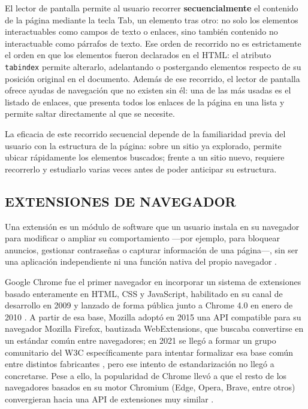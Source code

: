 El lector de pantalla permite al usuario recorrer \textbf{secuencialmente} el contenido de la página mediante la tecla Tab, un elemento tras otro: no solo los elementos interactuables como campos de texto o enlaces, sino también contenido no interactuable como párrafos de texto. Ese orden de recorrido no es estrictamente el orden en que los elementos fueron declarados en el HTML: el atributo \texttt{tabindex} permite alterarlo, adelantando o postergando elementos respecto de su posición original en el documento. Además de ese recorrido, el lector de pantalla ofrece ayudas de navegación que no existen sin él: una de las más usadas es el listado de enlaces, que presenta todos los enlaces de la página en una lista y permite saltar directamente al que se necesite.

La eficacia de este recorrido secuencial depende de la familiaridad previa del usuario con la estructura de la página: sobre un sitio ya explorado, permite ubicar rápidamente los elementos buscados; frente a un sitio nuevo, requiere recorrerlo y estudiarlo varias veces antes de poder anticipar su estructura.

\subsection{EXTENSIONES DE NAVEGADOR}

Una extensión es un módulo de software que un usuario instala en su navegador para modificar o ampliar su comportamiento —por ejemplo, para bloquear anuncios, gestionar contraseñas o capturar información de una página—, sin ser una aplicación independiente ni una función nativa del propio navegador \cite{mdnwebextensions}.

Google Chrome fue el primer navegador en incorporar un sistema de extensiones basado enteramente en HTML, CSS y JavaScript, habilitado en su canal de desarrollo en 2009 y lanzado de forma pública junto a Chrome 4.0 en enero de 2010 \cite{chromeextensionshistory}. A partir de esa base, Mozilla adoptó en 2015 una API compatible para su navegador Mozilla Firefox, bautizada WebExtensions, que buscaba convertirse en un estándar común entre navegadores; en 2021 se llegó a formar un grupo comunitario del W3C específicamente para intentar formalizar esa base común entre distintos fabricantes \cite{w3cwebextensionscg2021}, pero ese intento de estandarización no llegó a concretarse. Pese a ello, la popularidad de Chrome llevó a que el resto de los navegadores basados en su motor Chromium (Edge, Opera, Brave, entre otros) convergieran hacia una API de extensiones muy similar \cite{mdnwebextensions}.

